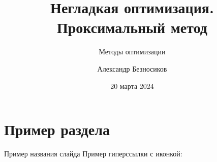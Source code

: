 \documentclass[aspectratio=43,11pt,xcolor=dvipsnames]{beamer}
\title[Лекция 5]{Негладкая оптимизация. Проксимальный метод}
\subtitle{Методы оптимизации}
\author[Александр Безносиков]{Александр Безносиков}
\date{20 марта 2024}
\begin{document}
\begin{frame}
	\titlepage
\end{frame}

\section{Пример раздела}

\begin{frame}{Пример названия слайда}
    Пример гиперссылки с иконкой:
\end{frame}
\end{document}
